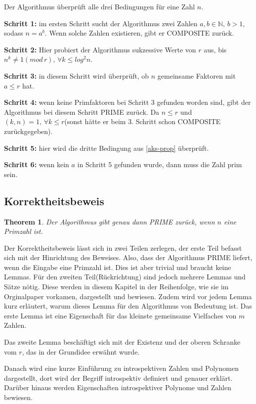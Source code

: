 \documentclass[12pt,oneside]{article}
\newtheorem{theorem}{Theorem}[section]
\theoremstyle{remark}
\theoremstyle{definition}
\begin{document}
Der Algorithmus überprüft alle drei Bedingungen für eine Zahl $n$.\newline

\textbf{Schritt 1: }im ersten Schritt sucht der Algorithmus zwei Zahlen $a,b \in \mathbb{N}, \, b > 1$, sodass $n = a^b$. Wenn solche Zahlen existieren, gibt er COMPOSITE zurück.  

\textbf{Schritt 2: }Hier probiert der Algorithmus sukzessive Werte von $r$ aus, bis $n^k \neq 1 (mod \, r), \, \forall k \leq log^2 n$.

\textbf{Schritt 3: } in diesem Schritt wird überprüft, ob $n$ gemeinsame Faktoren mit $a \leq r$ hat. 

\textbf{Schritt 4: } wenn keine Primfaktoren bei Schritt 3 gefunden worden sind, gibt der Algorithmus bei diesem Schritt PRIME zurück. Da $n \leq r$ und $(k,n) = 1, \, \forall k \leq r $(sonst hätte er beim 3. Schritt schon COMPOSITE zurückgegeben).

\textbf{Schritt 5: } hier wird die dritte Bedingung aus \ref{aks-prop} überprüft.

\textbf{Schritt 6: } wenn kein $a$ in Schritt 5 gefunden wurde, dann muss die Zahl prim sein. 
\subsection{Korrektheitsbeweis}

\begin{theorem}
Der Algorithmus gibt genau dann PRIME zurück, wenn $n$ eine Primzahl ist.
\end{theorem}
Der Korrektheitsbeweis lässt sich in zwei Teilen zerlegen, der erste Teil befasst sich mit der Hinrichtung des Beweises. Also, dass der Algorithmus PRIME liefert, wenn die Eingabe eine Primzahl ist. Dies ist aber trivial und braucht keine Lemmas. Für den zweiten Teil(Rückrichtung) sind jedoch mehrere Lemmas und Sätze nötig. Diese werden in diesem Kapitel in der Reihenfolge, wie sie im Orginalpaper vorkamen, dargestellt und bewiesen. Zudem wird vor jedem Lemma kurz erläutert, warum dieses Lemma für den Algorithmus von Bedeutung ist. Das erste Lemma ist eine Eigenschaft für das kleinste gemeinsame Vielfaches von $m$ Zahlen.

Das zweite Lemma beschäftigt sich mit der Existenz und der oberen Schranke vom $r$, das in der Grundidee erwähnt wurde.

Danach wird eine kurze Einführung zu introspektiven Zahlen und Polynomen dargestellt, dort wird der Begriff introspektiv definiert und genauer erklärt. Darüber hinaus werden Eigenschaften introspektiver Polynome und Zahlen bewiesen.
\end{document}
